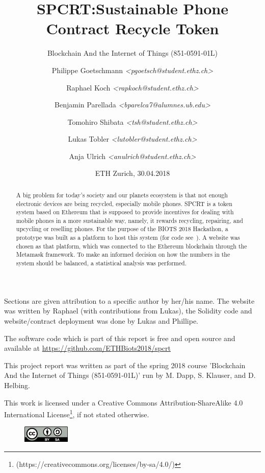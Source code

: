\documentclass[11pt]{scrartcl}
\title{SPCRT:\@ Sustainable Phone Contract Recycle Token}
\subtitle{Blockchain And the Internet of Things (851-0591-01L)}
\author{%
    Philippe Goetschmann \textit{\textless pgoetsch@student.ethz.ch\textgreater}%
    \and
    Raphael Koch \textit{\textless rapkoch@student.ethz.ch\textgreater}%
    \and
    Benjamin Parellada \textit{\textless bparelca7@alumnes.ub.edu\textgreater}%
    \and
    Tomohiro Shibata \textit{\textless tsh@student.ethz.ch\textgreater}%
    \and
    Lukas Tobler \textit{\textless lutobler@student.ethz.ch\textgreater}%
    \and
    Anja Ulrich \textit{\textless anulrich@student.ethz.ch\textgreater}%
}
\date{ETH Zurich, 30.04.2018}
\begin{document}
%
\maketitle
%
\begin{center}
Sections are given attribution to a specific author by her/his name. The website was written by Raphael (with contributions from Lukas), the Solidity code and website/contract deployment was done by Lukas and Phillipe.

\vspace{2mm}
The software code which is part of this report is free and open source and available at \url{https://github.com/ETHBiots2018/spcrt}

\vspace{2mm}
This project report was written as part of the spring 2018 course 'Blockchain And the Internet of Things (851-0591-01L)' run by M. Dapp, S. Klauser, and D. Helbing.

\vspace{2mm}
This work is licensed under a Creative Commons Attribution-ShareAlike 4.0
International License\footnote{(https://creativecommons.org/licenses/by-sa/4.0/)},
if not stated otherwise.
\end{center}

\begin{center}
    \begin{figure}[h]
        \centering
        \includegraphics[width=0.2\textwidth]{img/cc_license.png}
        \vspace{-0.2cm}
    \end{figure}
\end{center}

\pagebreak

\begin{abstract}
    A big problem for today's society and our planets ecosystem is that not
    enough electronic devices are being recycled, especially mobile phones.
    SPCRT is a token system based on Ethereum that is supposed to provide
    incentives for dealing with mobile phones in a more sustainable way, namely,
    it rewards recycling, repairing, and upcycling or reselling phones.  For
    the purpose of the BIOTS 2018 Hackathon, a prototype was built as a platform
    to host this system (for code see~\cite{spcgit}).  A website was chosen as that
    platform, which was connected to the Ethereum blockchain through the
    Metamask framework. To make an informed decision on how the numbers in the
    system should be balanced, a statistical analysis was performed.
\end{abstract}
\end{document}
